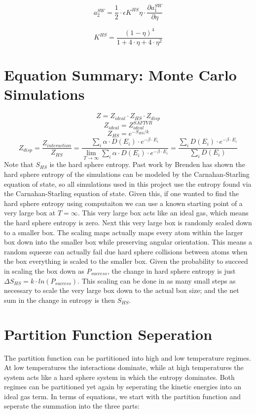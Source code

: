 \begin{multicols}{2}
\begin{equation}\label{eq:saft38}
a_2^{SW}=\frac{1}{2}\cdot \epsilon K^{HS}\eta\cdot \frac{\partial a_1^{SW}}{\partial \eta}
\end{equation}

\begin{equation}\label{eq:saft22}
K^{HS}=\frac{(1-\eta)^4}{1+4\cdot \eta+4\cdot \eta^2}
\end{equation}
\end{multicols}

\section{Equation Summary: Monte Carlo Simulations}
$$Z=Z_{ideal}\cdot Z_{HS}\cdot Z_{disp}$$
$$Z_{ideal}=Z_{ideal}^{SAFTVR}$$
$$Z_{HS}=e^{-S_{HS}/k}$$
$$Z_{disp}=\frac{Z_{interaction}}{Z_{HS}}=\frac{\sum_i \alpha\cdot D(E_i)\cdot e^{-\beta\cdot E_i}}{\lim_{T\to\infty}\sum_i \alpha\cdot D(E_i)\cdot e^{-\beta\cdot E_i}}=\frac{\sum_i D(E_i)\cdot e^{-\beta\cdot E_i}}{\sum_i D(E_i)}$$
Note that $S_{HS}$ is the hard sphere entropy. Past work by Brenden has shown the hard sphere entropy of the simulations can be modeled by the Carnahan-Starling equation of state, so all simulations used in this project use the entropy found via the Carnahan-Starling equation of state. Given this, if one wanted to find the hard sphere entropy using computaiton we can use a known starting point of a very large box at $T=\infty$. This very large box acts like an ideal gas, which means the hard sphere entropy is zero. Next this very large box is randomly scaled down to a smaller box. The scaling maps actually maps every atom within the larger box down into the smaller box while preserving angular orientation. This means a random squeeze can actually fail due hard sphere collisions between atoms when the box everything is scaled to the smaller box. Given the probability to succeed in scaling the box down as $P_{success}$, the change in hard sphere entropy is just $\Delta S_{HS}=k\cdot ln(P_{success})$. This scaling can be done in as many small steps as necessary to scale the very large box down to the actual box size; and the net sum in the change in entropy is then $S_{HS}$.

\section{Partition Function Seperation}
The partition function can be partitioned into high and low temperature regimes. At low temperatures the interactions dominate, while at high temperatures the system acts like a hard sphere system in which the entropy dominates. Both regimes can be partitioned yet again by seperating the kinetic energies into an ideal gas term. In terms of equations, we start with the partition function and seperate the summation into the three parts:


